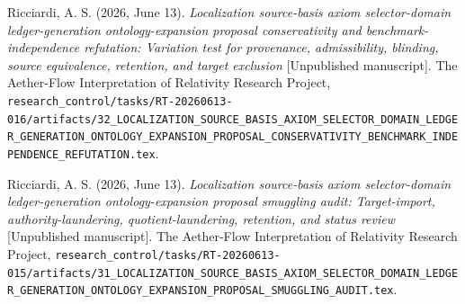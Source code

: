 \documentclass[11pt]{article}
\begin{document}
Ricciardi, A. S. (2026, June 13). \emph{Localization source-basis axiom
selector-domain ledger-generation ontology-expansion proposal
conservativity and benchmark-independence refutation: Variation test for
provenance, admissibility, blinding, source equivalence, retention, and
target exclusion} [Unpublished manuscript]. The Aether-Flow Interpretation
of Relativity Research Project,
\texttt{research\_control/tasks/RT-20260613-016/artifacts/32\_LOCALIZATION\_SOURCE\_BASIS\_AXIOM\_SELECTOR\_DOMAIN\_LEDGER\_GENERATION\_ONTOLOGY\_EXPANSION\_PROPOSAL\_CONSERVATIVITY\_BENCHMARK\_INDEPENDENCE\_REFUTATION.tex}.

Ricciardi, A. S. (2026, June 13). \emph{Localization source-basis axiom
selector-domain ledger-generation ontology-expansion proposal smuggling
audit: Target-import, authority-laundering, quotient-laundering, retention,
and status review} [Unpublished manuscript]. The Aether-Flow Interpretation
of Relativity Research Project,
\texttt{research\_control/tasks/RT-20260613-015/artifacts/31\_LOCALIZATION\_SOURCE\_BASIS\_AXIOM\_SELECTOR\_DOMAIN\_LEDGER\_GENERATION\_ONTOLOGY\_EXPANSION\_PROPOSAL\_SMUGGLING\_AUDIT.tex}.
\end{document}
